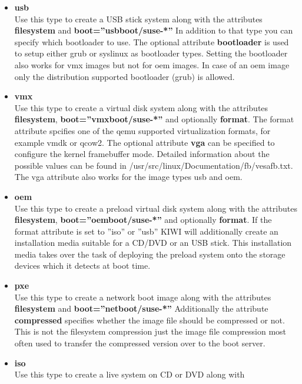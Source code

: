 \begin{itemize}
\item \textbf{usb}\\
      Use this type to create a USB stick system along with the
      attributes \textbf{filesystem} and \textbf{boot=''usbboot/suse-*''}
      In addition to that type you can specify which bootloader to use.
      The optional attribute \textbf{bootloader} is used to setup
      either grub or syslinux as bootloader types. Setting the bootloader
      also works for vmx images but not for oem images. In case of an
      oem image only the distribution supported bootloader (grub) is
      allowed.
\item \textbf{vmx}\\
      Use this type to create a virtual disk system along with the
      attributes \textbf{filesystem}, \textbf{boot=''vmxboot/suse-*''} and
      optionally \textbf{format}. The format attribute spcifies one of
      the qemu supported virtualization formats, for example vmdk or qcow2.
      The optional attribute \textbf{vga} can be specified to configure the
      kernel framebuffer mode. Detailed information about the possible
      values can be found in /usr/src/linux/Documentation/fb/vesafb.txt.
      The vga attribute also works for the image types usb and oem.
\item \textbf{oem}\\
      Use this type to create a preload virtual disk system along with
      the attributes \textbf{filesystem}, \textbf{boot=''oemboot/suse-*''} and
      optionally \textbf{format}. If the format attribute is set to
      ''iso'' or ''usb'' KIWI will additionally create an installation
      media suitable for a CD/DVD or an USB stick. This installation media
      takes over the task of deploying the preload system onto the
      storage devices which it detects at boot time.
\item \textbf{pxe}\\
      Use this type to create a network boot image along with the
      attributes \textbf{filesystem} and \textbf{boot=''netboot/suse-*''}
      Additionally the attribute \textbf{compressed} specifies whether
      the image file should be compressed or not. This is not the filesystem
      compression just the image file compression most often used to
      transfer the compressed version over to the boot server.
\item \textbf{iso}\\
      Use this type to create a live system on CD or DVD along with

\end{itemize}
